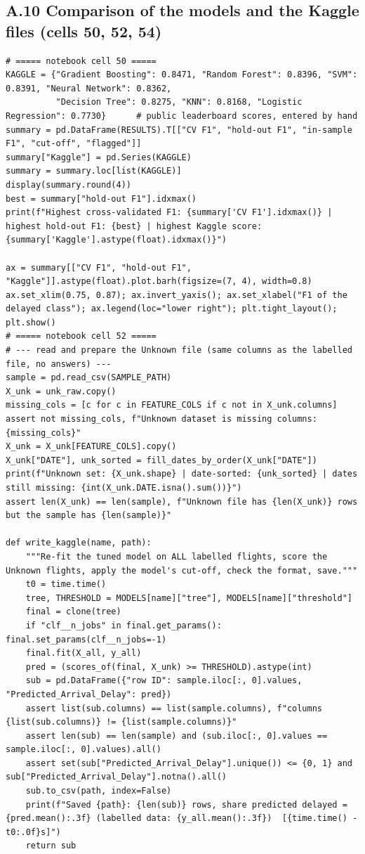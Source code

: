 \documentclass[12pt,a4paper]{article}
\begin{document}
\subsection*{A.10 Comparison of the models and the Kaggle files (cells 50, 52, 54)}
\begin{lstlisting}[style=code]
# ===== notebook cell 50 =====
KAGGLE = {"Gradient Boosting": 0.8471, "Random Forest": 0.8396, "SVM": 0.8391, "Neural Network": 0.8362,
          "Decision Tree": 0.8275, "KNN": 0.8168, "Logistic Regression": 0.7730}      # public leaderboard scores, entered by hand
summary = pd.DataFrame(RESULTS).T[["CV F1", "hold-out F1", "in-sample F1", "cut-off", "flagged"]]
summary["Kaggle"] = pd.Series(KAGGLE)
summary = summary.loc[list(KAGGLE)]
display(summary.round(4))
best = summary["hold-out F1"].idxmax()
print(f"Highest cross-validated F1: {summary['CV F1'].idxmax()} | highest hold-out F1: {best} | highest Kaggle score: {summary['Kaggle'].astype(float).idxmax()}")

ax = summary[["CV F1", "hold-out F1", "Kaggle"]].astype(float).plot.barh(figsize=(7, 4), width=0.8)
ax.set_xlim(0.75, 0.87); ax.invert_yaxis(); ax.set_xlabel("F1 of the delayed class"); ax.legend(loc="lower right"); plt.tight_layout(); plt.show()
# ===== notebook cell 52 =====
# --- read and prepare the Unknown file (same columns as the labelled file, no answers) ---
sample = pd.read_csv(SAMPLE_PATH)
X_unk = unk_raw.copy()
missing_cols = [c for c in FEATURE_COLS if c not in X_unk.columns]
assert not missing_cols, f"Unknown dataset is missing columns: {missing_cols}"
X_unk = X_unk[FEATURE_COLS].copy()
X_unk["DATE"], unk_sorted = fill_dates_by_order(X_unk["DATE"])
print(f"Unknown set: {X_unk.shape} | date-sorted: {unk_sorted} | dates still missing: {int(X_unk.DATE.isna().sum())}")
assert len(X_unk) == len(sample), f"Unknown file has {len(X_unk)} rows but the sample has {len(sample)}"

def write_kaggle(name, path):
    """Re-fit the tuned model on ALL labelled flights, score the Unknown flights, apply the model's cut-off, check the format, save."""
    t0 = time.time()
    tree, THRESHOLD = MODELS[name]["tree"], MODELS[name]["threshold"]
    final = clone(tree)
    if "clf__n_jobs" in final.get_params(): final.set_params(clf__n_jobs=-1)
    final.fit(X_all, y_all)
    pred = (scores_of(final, X_unk) >= THRESHOLD).astype(int)
    sub = pd.DataFrame({"row ID": sample.iloc[:, 0].values, "Predicted_Arrival_Delay": pred})
    assert list(sub.columns) == list(sample.columns), f"columns {list(sub.columns)} != {list(sample.columns)}"
    assert len(sub) == len(sample) and (sub.iloc[:, 0].values == sample.iloc[:, 0].values).all()
    assert set(sub["Predicted_Arrival_Delay"].unique()) <= {0, 1} and sub["Predicted_Arrival_Delay"].notna().all()
    sub.to_csv(path, index=False)
    print(f"Saved {path}: {len(sub)} rows, share predicted delayed = {pred.mean():.3f} (labelled data: {y_all.mean():.3f})  [{time.time() - t0:.0f}s]")
    return sub


\end{lstlisting}
\end{document}
